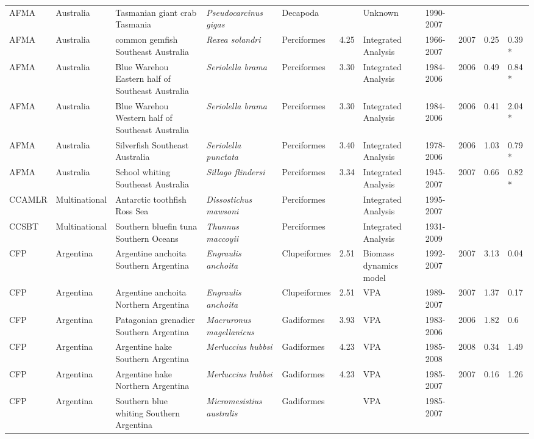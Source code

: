 \begin{longtable}{p{1.5cm}p{1.5cm}p{3cm}p{3cm}p{2.5cm}p{0.9cm}p{1.4cm}p{0.9cm}p{0.9cm}p{0.9cm}p{1cm}}
  AFMA & Australia & Tasmanian giant crab Tasmania & \textit{Pseudocarcinus gigas} & Decapoda &  & Unknown & 1990-2007 &  &  &  \\ 
  AFMA & Australia & common gemfish Southeast Australia & \textit{Rexea solandri} & Perciformes & 4.25 & Integrated Analysis & 1966-2007 & 2007 & 0.25 & 0.39 * \\ 
  AFMA & Australia & Blue Warehou Eastern half of Southeast Australia & \textit{Seriolella brama} & Perciformes & 3.30 & Integrated Analysis & 1984-2006 & 2006 & 0.49 & 0.84 * \\ 
  AFMA & Australia & Blue Warehou Western half of Southeast Australia & \textit{Seriolella brama} & Perciformes & 3.30 & Integrated Analysis & 1984-2006 & 2006 & 0.41 & 2.04 * \\ 
  AFMA & Australia & Silverfish Southeast Australia & \textit{Seriolella punctata} & Perciformes & 3.40 & Integrated Analysis & 1978-2006 & 2006 & 1.03 & 0.79 * \\ 
  AFMA & Australia & School whiting Southeast Australia & \textit{Sillago flindersi} & Perciformes & 3.34 & Integrated Analysis & 1945-2007 & 2007 & 0.66 & 0.82 * \\ 
  CCAMLR & Multinational & Antarctic toothfish Ross Sea & \textit{Dissostichus mawsoni} & Perciformes &  & Integrated Analysis & 1995-2007 &  &  &  \\ 
  CCSBT & Multinational & Southern bluefin tuna Southern Oceans & \textit{Thunnus maccoyii} & Perciformes &  & Integrated Analysis & 1931-2009 &  &  &  \\ 
  CFP & Argentina & Argentine anchoita Southern Argentina & \textit{Engraulis anchoita} & Clupeiformes & 2.51 & Biomass dynamics model & 1992-2007 & 2007 & 3.13 & 0.04 \\ 
  CFP & Argentina & Argentine anchoita Northern Argentina & \textit{Engraulis anchoita} & Clupeiformes & 2.51 & VPA & 1989-2007 & 2007 & 1.37 & 0.17 \\ 
  CFP & Argentina & Patagonian grenadier Southern Argentina & \textit{Macruronus magellanicus} & Gadiformes & 3.93 & VPA & 1983-2006 & 2006 & 1.82 & 0.6 \\ 
  CFP & Argentina & Argentine hake Southern Argentina & \textit{Merluccius hubbsi} & Gadiformes & 4.23 & VPA & 1985-2008 & 2008 & 0.34 & 1.49 \\ 
  CFP & Argentina & Argentine hake Northern Argentina & \textit{Merluccius hubbsi} & Gadiformes & 4.23 & VPA & 1985-2007 & 2007 & 0.16 & 1.26 \\ 
  CFP & Argentina &  Southern blue whiting Southern Argentina & \textit{Micromesistius australis} & Gadiformes &  & VPA & 1985-2007 &  &  &  \\ 

\end{longtable}
